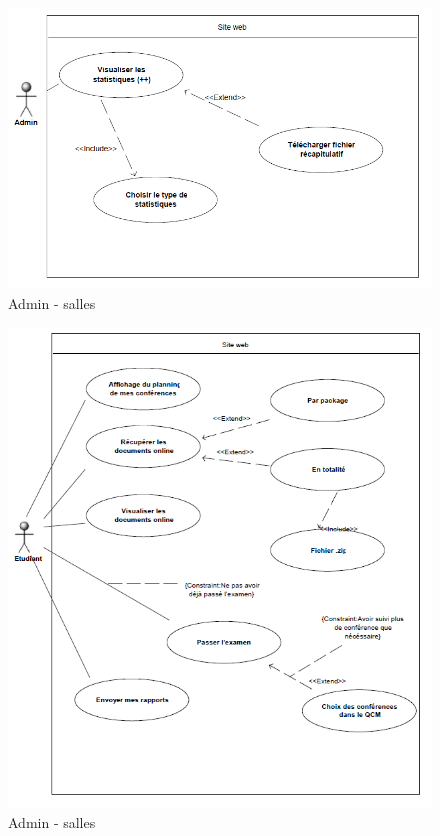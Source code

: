     \begin{figure}[h]
        \begin{center}
            \includegraphics[scale=0.50]{images/uml/adminStats.png} 
        \end{center}

        \caption{Admin - salles}
        \label{Admin - salles}
    \end{figure}

    \begin{figure}[h]
        \begin{center}
            \includegraphics[scale=0.50]{images/uml/etudiantMenuFinal.png} 
        \end{center}

        \caption{Admin - salles}
        \label{Admin - salles}
    \end{figure}

